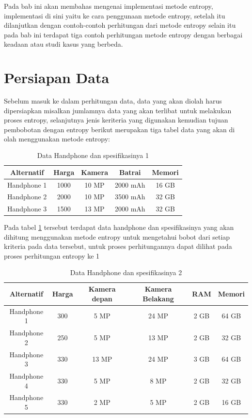 Pada bab ini akan membahas mengenai implementasi metode entropy, implementasi di sini yaitu ke cara penggunaan metode entropy, setelah itu dilanjutkan dengan contoh-contoh perhitungan dari metode entropy selain itu pada bab ini terdapat tiga contoh perhitungan metode entropy dengan berbagai keadaan atau studi kasus yang berbeda.
\pagebreak

\section{Persiapan Data}

	Sebelum masuk ke dalam perhitungan data, data yang akan diolah harus dipersiapkan misalkan jumlamnya data yang akan terlibat untuk melakukan proses entropy, selanjutnya jenis keriteria yang digunakan kemudian tujuan pembobotan dengan entropy berikut merupakan tiga tabel data yang akan di olah menggunakan metode entropy:

\begin{table}[h]
\caption{Data Handphone dan spesifikasinya 1}
\centering
\begin{tabular}{|c|c|c|c|c|}
\hline
Alternatif & Harga & Kamera & Batrai&Memori\\
\hline
Handphone 1 &1000 & 10 MP & 2000 mAh &  16 GB\\
\hline
Handphone 2 &2000 & 10 MP & 3500 mAh &  32 GB\\
\hline
Handphone 3 &1500 & 13 MP & 2000 mAh &  32 GB\\
\hline

\end{tabular}
\label{T3}
\end{table}

Pada tabel \ref{T3} tersebut terdapat data handphone dan spesifikasinya yang akan dihitung menggunakan metode entropy untuk mengetahui bobot dari setiap kriteria pada data tersebut, untuk proses perhitungannya dapat dilihat pada proses perhitungan entropy ke 1

\begin{table}[h]
\caption{Data Handphone dan spesifikasinya 2}
\centering
\begin{tabular}{|c|c|c|c|c|c|}
\hline
Alternatif & Harga & Kamera depan & Kamera Belakang&RAM& Memori\\
\hline
Handphone 1 &300& 5 MP & 24 MP &  2 GB&64 GB\\
\hline
Handphone 2 &250 & 5 MP & 13 MP &  2 GB&32 GB\\
\hline
Handphone 3 &330 & 13 MP & 24 MP &  3 GB&64 GB\\
\hline
Handphone 4 &330 & 5 MP & 8 MP &  2 GB&32 GB\\
\hline
Handphone 5 &330 & 2 MP & 5 MP &  2 GB&16 GB\\
\hline

\end{tabular}
\label{T4}
\end{table}

